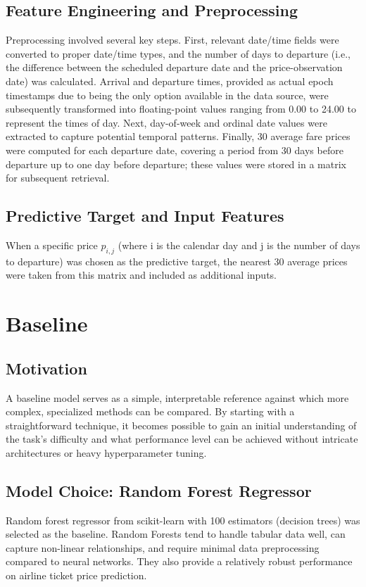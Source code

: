 \documentclass[conference]{IEEEtran}
\begin{document}
\subsection{Feature Engineering and Preprocessing}\label{3b}
Preprocessing involved several key steps. First, relevant date/time fields were converted to proper date/time types, and the number of days to departure (i.e., the difference between the scheduled departure date and the price-observation date) was calculated. Arrival and departure times, provided as actual epoch timestamps due to being the only option available in the data source, were subsequently transformed into floating-point values ranging from 0.00 to 24.00 to represent the times of day. Next, day-of-week and ordinal date values were extracted to capture potential temporal patterns. Finally, 30 average fare prices were computed for each departure date, covering a period from 30 days before departure up to one day before departure; these values were stored in a matrix for subsequent retrieval.

\subsection{Predictive Target and Input Features}\label{3c}
When a specific price $p_{i,j}$ (where i is the calendar day and j is the number of days to departure) was chosen as the predictive target, the nearest 30 average prices were taken from this matrix and included as additional inputs.


\section{Baseline}
\subsection{Motivation}\label{4a}
A baseline model serves as a simple, interpretable reference against which more complex, specialized methods can be compared. By starting with a straightforward technique, it becomes possible to gain an initial understanding of the task’s difficulty and what performance level can be achieved without intricate architectures or heavy hyperparameter tuning.

\subsection{Model Choice: Random Forest Regressor}\label{4b}
Random forest regressor from scikit-learn with 100 estimators (decision trees) was selected as the baseline. Random Forests tend to handle tabular data well, can capture non-linear relationships, and require minimal data preprocessing compared to neural networks. They also provide a relatively robust performance on airline ticket price prediction\cite{b6}.
\end{document}
